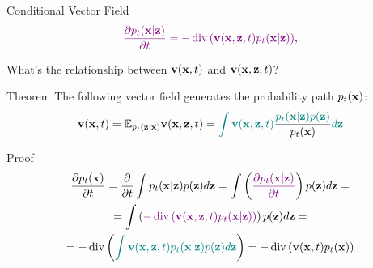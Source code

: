 \documentclass{beamer}
\renewcommand{\eqpause}{}
\renewcommand{\nextonslide}[1]{#1}
\begin{document}
\begin{frame}{Conditional Vector Field}
	\[
		{\color{violet}\frac{\partial p_t(\mathbf{x} | \mathbf{z})}{\partial t} = - \operatorname{div}\left(\mathbf{v}(\mathbf{x}, \mathbf{z}, t) p_t(\mathbf{x} | \mathbf{z})\right)},
	\]

	What's the relationship between $\mathbf{v}(\mathbf{x}, t)$ and $\mathbf{v}(\mathbf{x}, \mathbf{z}, t)$?
	\eqpause
	\begin{block}{Theorem}
		The following vector field generates the probability path $p_t(\mathbf{x})$:
		\vspace{-0.3cm}
		\[
			\mathbf{v}(\mathbf{x}, t) = \mathbb{E}_{p_t(\mathbf{z} | \mathbf{x})} \mathbf{v}(\mathbf{x}, \mathbf{z}, t)  = {\color{teal}\int \mathbf{v}(\mathbf{x}, \mathbf{z}, t)} \frac{\color{teal}p_t(\mathbf{x} | \mathbf{z}) p(\mathbf{z})}{p_t(\mathbf{x})} {\color{teal}d \mathbf{z}}
		\]
		\vspace{-0.7cm}
	\end{block}
    \eqpause
	\begin{block}{Proof}
		\vspace{-0.7cm}
		\begin{multline*}
			\frac{\partial p_t(\bx)}{\partial t} = \frac{\partial}{\partial t} \int p_t(\bx | \bz) p(\bz) d \bz 
			\nextonslide{=  \int \left( {\color{violet} \frac{\partial p_t(\bx | \bz)}{\partial t} } \right) p(\bz) d \bz}
			\nextonslide{ = \\ = \int \left( {\color{violet} - \diver\left(\bv(\bx, \bz, t) p_t(\bx | \bz)\right) } \right) p(\bz) d \bz}
			\nextonslide{ = \\ = - \diver \left({\color{teal}\int \bv(\bx, \bz, t) p_t(\bx | \bz) p(\bz) d \bz }\right)} 
			\nextonslide{= - \diver  \left(\bv(\bx, t) p_t(\bx)\right)}
		\end{multline*}
	\end{block}
\end{frame}
\end{document}
